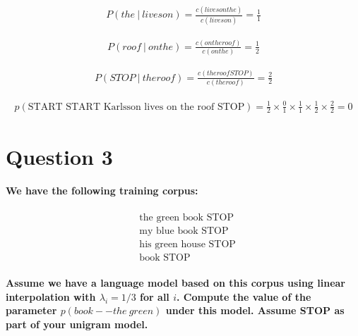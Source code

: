 \documentclass{article}
\newcommand\given[1][]{\:#1\vert\:}
\begin{document}
\begin{equation*}
    \begin{split}
    P(the \given lives
on) = \frac{c(lives
on
the)}{ c(lives
on)} = \frac{1}{1}
    \end{split}
\end{equation*}

\begin{equation*}
    \begin{split}
    P(roof \given on
the) = \frac{c(on
the
roof)}{ c(on
the)} = \frac{1}{2}
    \end{split}
\end{equation*}

\begin{equation*}
    \begin{split}
    P(STOP \given the
roof) = \frac{c(the
roof
STOP)}{ c(the
roof)} = \frac{2}{2}
    \end{split}
\end{equation*}


\begin{equation*}
    \begin{split}
    p(\text{START START Karlsson lives on the roof STOP}) = \frac{1}{2} \times \frac{0}{1} \times \frac{1}{1} \times \frac{1}{2} \times \frac{2}{2} = 0
    \end{split}
\end{equation*}






\clearpage

\section*{Question 3}
\paragraph{We have the following training corpus:}

\begin{equation*}
    \begin{split}
    &\text{the green book STOP}\\
    &\text{my blue book STOP}\\
    &\text{his green house STOP}\\
    &\text{book STOP}
    \end{split}
\end{equation*}


\paragraph{Assume we have a language model based on this corpus using linear interpolation with $\lambda_i = 1 / 3$ for all $i$. Compute the value of the parameter $p(book--the\ green)$ under this model. Assume STOP as part of your unigram model.}
\end{document}
